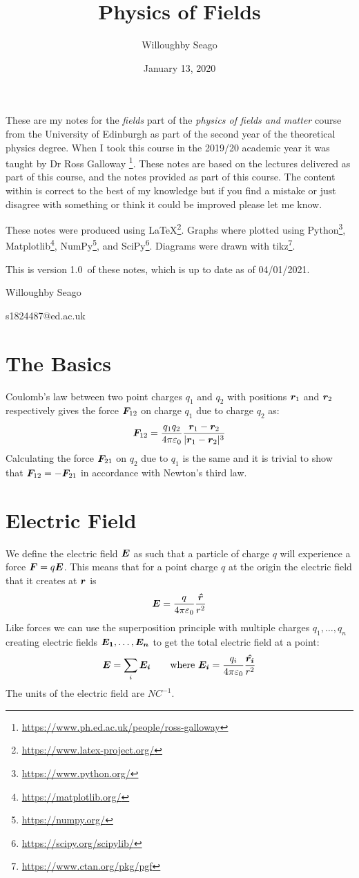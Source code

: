 \documentclass{article}
\author{Willoughby Seago}
\date{January 13, 2020}  %
\title{Physics of Fields}
\newcommand{\notesVersion}{1.0}
\newcommand{\notesDate}{04/01/2021}
\begin{document}
    \maketitle
    These are my notes for the \textit{fields} part of the \textit{physics of fields and matter} course from the University of Edinburgh as part of the second year of the theoretical physics degree.
    When I took this course in the 2019/20 academic year it was taught by Dr Ross Galloway \footnote{\url{https://www.ph.ed.ac.uk/people/ross-galloway}}.
    These notes are based on the lectures delivered as part of this course, and the notes provided as part of this course.
    The content within is correct to the best of my knowledge but if you find a mistake or just disagree with something or think it could be improved please let me know.
    
    These notes were produced using \LaTeX\footnote{\url{https://www.latex-project.org/}}.
    Graphs where plotted using Python\footnote{\url{https://www.python.org/}}, Matplotlib\footnote{\url{https://matplotlib.org/}}, NumPy\footnote{\url{https://numpy.org/}}, and SciPy\footnote{\url{https://scipy.org/scipylib/}}.
    Diagrams were drawn with tikz\footnote{\url{https://www.ctan.org/pkg/pgf}}.
    
    This is version \notesVersion~of these notes, which is up to date as of \notesDate.
    \begin{flushright}
        Willoughby Seago
        
        s1824487@ed.ac.uk
    \end{flushright}
    \clearpage
    \tableofcontents
    \listoffigures
    \listoftables
    \clearpage
    
    \section{The Basics}
    Coulomb's law between two point charges \(q_1\) and \(q_2\) with positions \(\bm{r}_1\) and \(\bm{r}_2\) respectively gives the force \(\bm{F}_{12}\) on charge \(q_1\) due to charge \(q_2\) as:
    \[\bm{F}_{12} = \frac{q_1q_2}{4\pi\varepsilon_0}\frac{\bm{r}_1 - \bm{r}_2}{|\bm{r}_1 - \bm{r}_2|^3}\]
    Calculating the force \(\bm{F}_{21}\) on \(q_2\) due to \(q_1\) is the same and it is trivial to show that \(\bm{F}_{12} = - \bm{F}_{21}\) in accordance with Newton's third law.
    
    \section{Electric Field}
    We define the electric field \(\bm{E}\) as such that a particle of charge \(q\) will experience a force \(\bm{F} = q\bm{E}\).
    This means that for a point charge \(q\) at the origin the electric field that it creates at \(\bm{r}\) is
    \[\bm{E} = \frac{q}{4\pi\varepsilon_0}\frac{\bm{\hat{r}}}{r^2}\]
    Like forces we can use the superposition principle with multiple charges \(q_1,\dotsc,q_n\)  creating electric fields \(\bm{E_1},\dotsc,\bm{E_n}\) to get the total electric field at a point:
    \[\bm{E} = \sum_i\bm{E_i}\qquad\text{where }\bm{E_i} = \frac{q_i}{4\pi\varepsilon_0}\frac{\bm{\hat{r_i}}}{r^2}\]
    The units of the electric field are \(\si{NC^{-1}}\).
    
\end{document}
